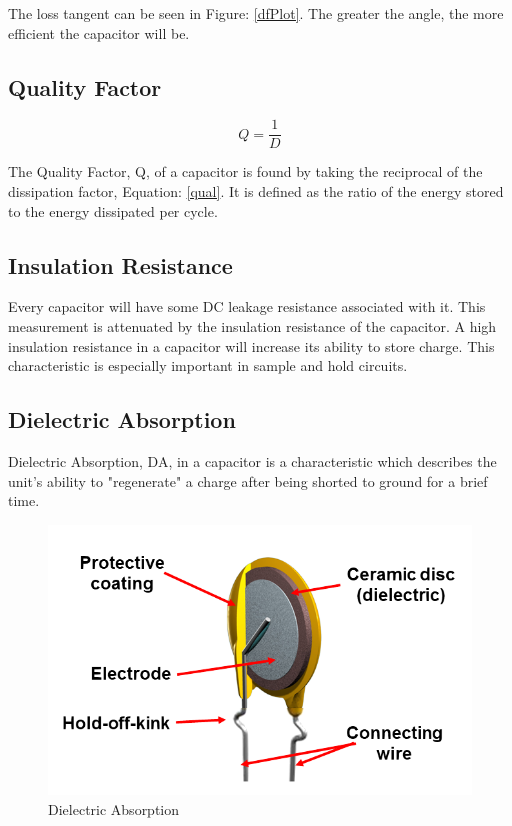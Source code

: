 The loss tangent can be seen in Figure: \ref{dfPlot}. The greater the angle, the more efficient the capacitor will be.

\subsection{Quality Factor}

\begin{equation}
\label{qual}
Q = \frac{1}{D}
\end{equation}

The Quality Factor, Q, of a capacitor is found by taking the reciprocal of the dissipation factor, Equation: \eqref{qual}. It is defined as the ratio of the energy stored to the energy dissipated per cycle.

\subsection{Insulation Resistance}

Every capacitor will have some DC leakage resistance associated with it. This measurement is attenuated by the insulation resistance of the capacitor. A high insulation resistance in a capacitor will increase its ability to store charge. This characteristic is especially important in sample and hold circuits.

\subsection{Dielectric Absorption}

Dielectric Absorption, DA, in a capacitor is a characteristic which describes the unit's ability to "regenerate" a charge after being shorted to ground for a brief time.

\begin{figure}
    \includegraphics[keepaspectratio=true,scale=.5]{./figures/testImage.png}
    \centering
    \caption{Dielectric Absorption}
    \label{daPlot}
\end{figure}

